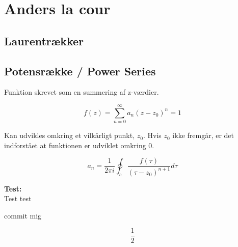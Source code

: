\chapter{Anders la cour}

\section{Laurentrækker}

\section{Potensrække / Power Series}

Funktion skrevet som en summering af z-værdier. 


\begin{equation*}
       f(z)=\sum_{n=0}^{\infty} a_{n}(z-z_0)^{n} = 1  
\end{equation*}

Kan udvikles omkring et vilkårligt punkt, \(z_0\).
Hvis \(z_0\) ikke fremgår, er det indforstået at funktionen er udviklet omkring 0. 


\begin{equation*}
a_n = \frac{1}{2\pi i} \oint_c \frac{f(\tau)}{(\tau-z_0)^{n+1}} d\tau
\end{equation*}


\begin{tcolorbox}[colback=white!5!white,colframe=blue!75!black]
  \textbf{Test:}\\
Test test
\end{tcolorbox}

commit mig


$$ \frac{1}{2} $$